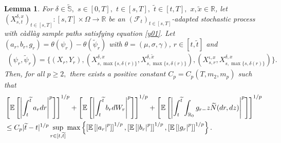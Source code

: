 \documentclass[11pt]{article}
\theoremstyle{theorem}
\newtheorem{Lem}[Def]{Lemma}
\theoremstyle{definition}
\newcommand{\bR}{\mathbb{R}}
\newcommand{\mf}{\mathcal{F}}
\newcommand{\1}{{\bf 1}}
\begin{document}
\begin{Lem}
\label{Lem3.1} 
 For $\delta \in \widetilde{\mathbb{S}},$ $s\in [0,T],$ $t\in [s, T],$ $\widetilde{t} \in [t, T],$ $x, \widetilde{x}\in\mathbb{R}$, let $(X^{\delta,x}_{s,t})_{t\in[s,T]}:[s,T]  \times\Omega\to\mathbb{R} $ 
be an $(\mf_t)_{t\in[s,T]}$-adapted stochastic process with c\`adl\`ag  sample paths satisfying equation \eqref{y01}. Let $(a_r, b_r, g_r) = \theta (\psi_r)-\theta(\widetilde{\psi}_r)$ with $\theta = (\mu, \sigma, \gamma)$, $r\in [t, \widetilde{t}]$ and 
 \begin{align*}
     (\psi_r, \widetilde{\psi}_r) = \Big\{(X_r, Y_r), (X_{s,\max\{s,\delta(r)\}}^{\delta,x}, X_{s,\max\{s,\delta(r)\}}^{\delta,\widetilde{x}}), (X^{\iota ,x}_{s,r}, X_{s,\max\{s,\delta(r)\}}^{\delta,x})\Big\}.
     \end{align*}
     Then, for all $p\ge 2,$ there exists a positive constant $C_p=C_p(T, m_2, m_p)$ such that 
 \begin{align*}
 &\left[\mathbb{E} \left[\left| \int_t^{\widetilde{t}} a_r dr \right|^p \right]\right]^{1/p} + \left[\mathbb{E} \left[\left| \int_t^{\widetilde{t}} b_r dW_r \right|^p \right]\right]^{1/p} + \left[\mathbb{E}\left[ \left| \int_t^{\widetilde{t}} \int _{\bR_0} g_{r-} z \widetilde{N}(dr, dz) \right|^p \right]\right]^{1/p} \notag  \\
  & \leq C_p |\widetilde{t} -t|^{1/p} \sup_{r\in [t, \widetilde{t}]} \max \left\{ \left [\mathbb{E} \left[\left| a_r \right|^p\right]\right]^{1/p}, \left [\mathbb{E} \left[\left| b_r \right|^p\right]\right]^{1/p}, \left [\mathbb{E} \left[\left| g_r \right|^p\right]\right]^{1/p} \right\}.
  \end{align*}
\end{Lem}
\end{document}
